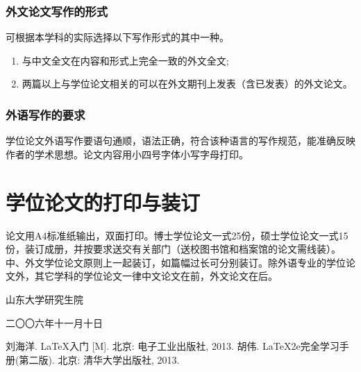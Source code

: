 \documentclass[openany]{sduthesis} %
\begin{document}
\subsubsection{外文论文写作的形式}
可根据本学科的实际选择以下写作形式的其中一种。
\begin{enumerate}
\item 与中文全文在内容和形式上完全一致的外文全文;
\item 两篇以上与学位论文相关的可以在外文期刊上发表（含已发表）的外文论文。
\end{enumerate}
\subsubsection{外语写作的要求}
学位论文外语写作要语句通顺，语法正确，符合该种语言的写作规范，能准确反映作者的学术思想。论文内容用小四号字体小写字母打印。
\section{学位论文的打印与装订}
论文用A4标准纸输出，双面打印。博士学位论文一式25份，硕士学位论文一式15份，装订成册，并按要求送交有关部门（送校图书馆和档案馆的论文需线装）。中、外文学位论文原则上一起装订，如篇幅过长可分别装订。除外语专业的学位论文外，其它学科的学位论文一律中文论文在前，外文论文在后。
\vfill
\hfill\begin{minipage}{.3\textwidth}
山东大学研究生院

二〇〇六年十一月十日
\end{minipage}

\begin{thebibliography}{1}
 刘海洋. \LaTeX 入门 [M]. 北京: 电子工业出版社, 2013.
  胡伟. \LaTeX 2e完全学习手册(第二版). 北京: 清华大学出版社, 2013.
\end{thebibliography}
\end{document}
